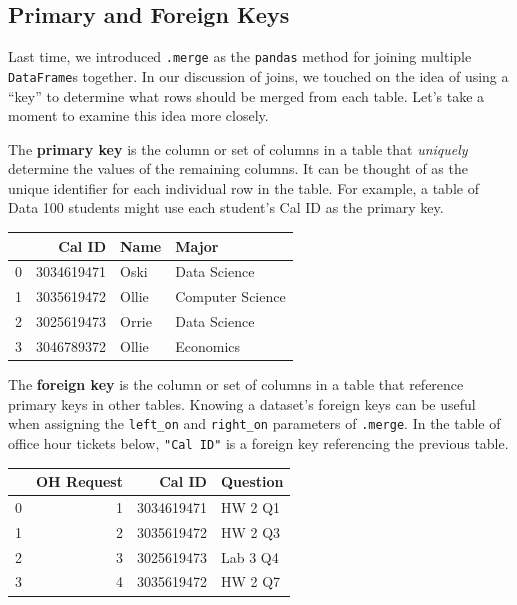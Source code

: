 \documentclass[
  letterpaper,
  DIV=11,
  numbers=noendperiod]{scrreprt}
\begin{document}
\hypertarget{primary-and-foreign-keys}{%
\subsection{Primary and Foreign Keys}\label{primary-and-foreign-keys}}

Last time, we introduced \texttt{.merge} as the \texttt{pandas} method
for joining multiple \texttt{DataFrame}s together. In our discussion of
joins, we touched on the idea of using a ``key'' to determine what rows
should be merged from each table. Let's take a moment to examine this
idea more closely.

The \textbf{primary key} is the column or set of columns in a table that
\emph{uniquely} determine the values of the remaining columns. It can be
thought of as the unique identifier for each individual row in the
table. For example, a table of Data 100 students might use each
student's Cal ID as the primary key.

\begin{tabular}{lrll}
\toprule
{} &      Cal ID &   Name &             Major \\
\midrule
0 &  3034619471 &   Oski &      Data Science \\
1 &  3035619472 &  Ollie &  Computer Science \\
2 &  3025619473 &  Orrie &      Data Science \\
3 &  3046789372 &  Ollie &         Economics \\
\bottomrule
\end{tabular}

The \textbf{foreign key} is the column or set of columns in a table that
reference primary keys in other tables. Knowing a dataset's foreign keys
can be useful when assigning the \texttt{left\_on} and
\texttt{right\_on} parameters of \texttt{.merge}. In the table of office
hour tickets below, \texttt{"Cal\ ID"} is a foreign key referencing the
previous table.

\begin{tabular}{lrrl}
\toprule
{} &  OH Request &      Cal ID &  Question \\
\midrule
0 &           1 &  3034619471 &   HW 2 Q1 \\
1 &           2 &  3035619472 &   HW 2 Q3 \\
2 &           3 &  3025619473 &  Lab 3 Q4 \\
3 &           4 &  3035619472 &   HW 2 Q7 \\
\bottomrule
\end{tabular}
\end{document}
